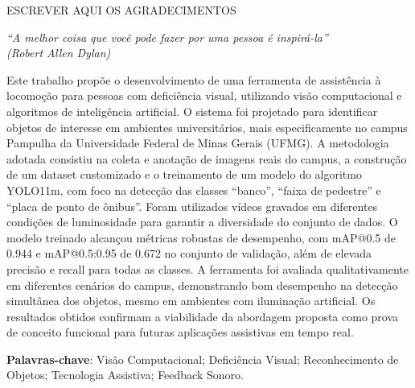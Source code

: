 \documentclass[
	12pt,				%
	openright,			%
	oneside,			%
	a4paper,			%
	english,			%
	french,				%
	spanish,			%
	brazil,				%
	]{abntex2}
\begin{document}
\begin{agradecimentos}
ESCREVER AQUI OS AGRADECIMENTOS
\end{agradecimentos}

 \begin{epigrafe}
     \vspace*{\fill}
 	\begin{flushright}
  		\textit{“A melhor coisa que você pode fazer por uma pessoa é inspirá-la” \\ 
  		(Robert Allen Dylan)}
  	\end{flushright}
  \end{epigrafe}


 \begin{resumo}
Este trabalho propõe o desenvolvimento de uma ferramenta de assistência à locomoção para pessoas com deficiência visual, utilizando visão computacional e algoritmos de inteligência artificial. O sistema foi projetado para identificar objetos de interesse em ambientes universitários, mais especificamente no campus Pampulha da Universidade Federal de Minas Gerais (UFMG). A metodologia adotada consistiu na coleta e anotação de imagens reais do campus, a construção de um dataset customizado e o treinamento de um modelo do algoritmo YOLO11m, com foco na detecção das classes “banco”, “faixa de pedestre” e “placa de ponto de ônibus”. Foram utilizados vídeos gravados em diferentes condições de luminosidade para garantir a diversidade do conjunto de dados. O modelo treinado alcançou métricas robustas de desempenho, com mAP@0.5 de 0.944 e mAP@0.5:0.95 de 0.672 no conjunto de validação, além de elevada precisão e recall para todas as classes. A ferramenta foi avaliada qualitativamente em diferentes cenários do campus, demonstrando bom desempenho na detecção simultânea dos objetos, mesmo em ambientes com iluminação artificial. Os resultados obtidos confirmam a viabilidade da abordagem proposta como prova de conceito funcional para futuras aplicações assistivas em tempo real.

 \vspace{\onelineskip}
    
 \noindent
 \textbf{Palavras-chave}: Visão Computacional; Deficiência Visual; Reconhecimento de Objetos; Tecnologia Assistiva; Feedback Sonoro.
 \end{resumo}
\end{document}
